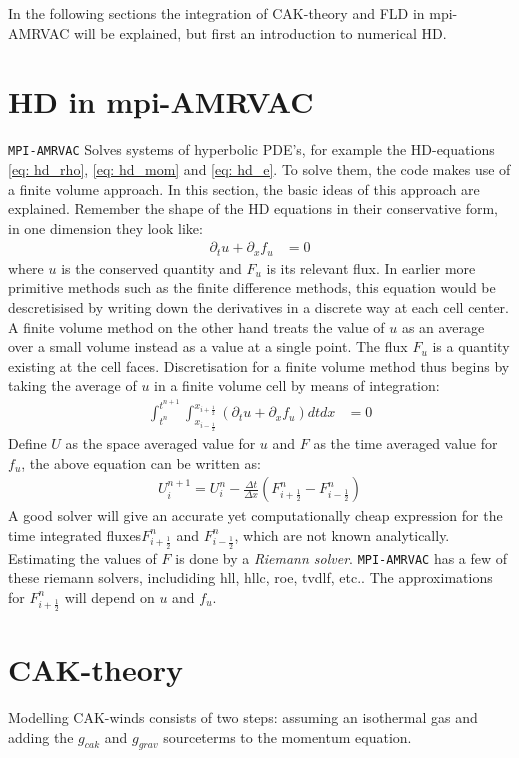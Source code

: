 In the following sections the integration of CAK-theory and FLD in mpi-AMRVAC will be explained, but first an introduction to numerical HD.


\section{HD in mpi-AMRVAC}
\texttt{MPI-AMRVAC} Solves systems of hyperbolic PDE's, for example the HD-equations \eqref{eq: hd_rho}, \eqref{eq: hd_mom} and \eqref{eq: hd_e}. To solve them, the code makes use of a finite volume approach. In this section, the basic ideas of this approach are explained. Remember the shape of the HD equations in their conservative form, in one dimension they look like:
\begin{align}
\partial_t u + \partial_x f_u &= 0 \label{eq: cons form}
\end{align}
where $u$ is the conserved quantity and $F_u$ is its relevant flux. In earlier more primitive methods such as the finite difference methods, this equation would be descretisised by writing down the derivatives in a discrete way at each cell center. A finite volume method on the other hand treats the value of $u$ as an average over a small volume instead as a value at a single point. The flux $F_u$ is a quantity existing at the cell faces. Discretisation for a finite volume method thus begins by taking the average of $u$ in a finite volume cell by means of integration:
\begin{align} 
\int_{t^n}^{t^{n+1}} \int_{x_{i-\frac{1}{2}}}^{x_{i+\frac{1}{2}}} \left( \partial_t u + \partial_x f_u \right) dt dx &= 0 
\end{align}
Define $U$ as the space averaged value for $u$ and $F$ as the time averaged value for $f_u$, the above equation can be written as:
\begin{align}
U^{n+1}_i = U^n_i - \frac{\Delta t}{\Delta x}\left(F^n_{i+\frac{1}{2}} - F^n_{i-\frac{1}{2}} \right) 
\end{align}
A good solver will give an accurate yet computationally cheap expression for the time integrated fluxes$F^n_{i+\frac{1}{2}}$ and $F^n_{i-\frac{1}{2}}$, which are not known analytically. Estimating the values of $F$ is done by a \emph{Riemann solver}. \texttt{MPI-AMRVAC} has a few of these riemann solvers, includiding  hll, hllc, roe, tvdlf, etc.. The approximations for $F^n_{i+\frac{1}{2}}$ will depend on $u$ and $f_u$.\\ 

\section{CAK-theory}
Modelling CAK-winds consists of two steps: assuming an isothermal gas and adding the $g_{cak}$ and $g_{grav}$ sourceterms to the momentum equation.


